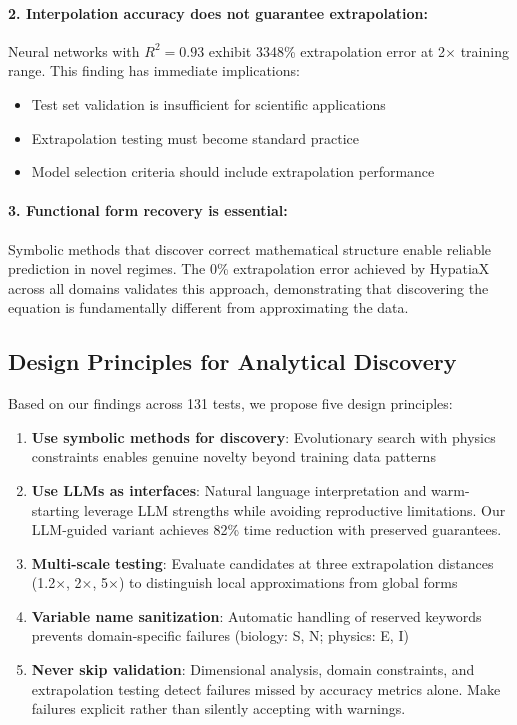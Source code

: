 \paragraph{2. Interpolation accuracy does not guarantee extrapolation:}

Neural networks with $R^2 = 0.93$ exhibit 3348\% extrapolation error at 2$\times$ training range. This finding has immediate implications:
\begin{itemize}
\item Test set validation is insufficient for scientific applications
\item Extrapolation testing must become standard practice
\item Model selection criteria should include extrapolation performance
\end{itemize}

\paragraph{3. Functional form recovery is essential:}

Symbolic methods that discover correct mathematical structure enable reliable prediction in novel regimes. The 0\% extrapolation error achieved by HypatiaX across all domains validates this approach, demonstrating that discovering the equation is fundamentally different from approximating the data.

\subsection{Design Principles for Analytical Discovery}

Based on our findings across 131 tests, we propose five design principles:

\begin{enumerate}
\item \textbf{Use symbolic methods for discovery}: Evolutionary search with physics constraints enables genuine novelty beyond training data patterns

\item \textbf{Use LLMs as interfaces}: Natural language interpretation and warm-starting leverage LLM strengths while avoiding reproductive limitations. Our LLM-guided variant achieves 82\% time reduction with preserved guarantees.

\item \textbf{Multi-scale testing}: Evaluate candidates at three extrapolation distances (1.2$\times$, 2$\times$, 5$\times$) to distinguish local approximations from global forms

\item \textbf{Variable name sanitization}: Automatic handling of reserved keywords prevents domain-specific failures (biology: S, N; physics: E, I)

\item \textbf{Never skip validation}: Dimensional analysis, domain constraints, and extrapolation testing detect failures missed by accuracy metrics alone. Make failures explicit rather than silently accepting with warnings.
\end{enumerate}

